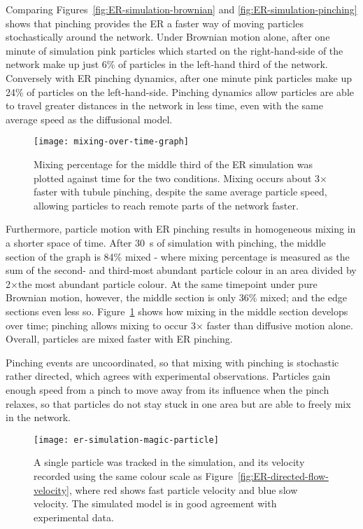 Comparing Figures~\ref{fig:ER-simulation-brownian} and \ref{fig:ER-simulation-pinching} shows that pinching provides the ER a faster way of moving particles stochastically around the network. 
Under Brownian motion alone, after one minute of simulation pink particles which started on the right-hand-side of the network make up just 6\% of particles in the left-hand third of the network. 
Conversely with ER pinching dynamics, after one minute pink particles make up 24\% of particles on the left-hand-side. 
Pinching dynamics allow particles are able to travel greater distances in the network in less time, even with the same average speed as the diffusional model. 

\begin{figure}[b!]
	\centering
	\texttt{[image: mixing-over-time-graph]}
	\caption[ER simulation: Tubule pinching provides faster mixing than Brownian motion alone]{Mixing percentage for the middle third of the ER simulation was plotted against time for the two conditions. Mixing occurs about 3$\times$ faster with tubule pinching, despite the same average particle speed, allowing particles to reach remote parts of the network faster.}
	\label{fig:mixing-over-time-graph}
\end{figure}

Furthermore, particle motion with ER pinching results in homogeneous mixing in a shorter space of time. 
After \SI{30}{\second} of simulation with pinching, the middle section of the graph is 84\% mixed - where mixing percentage is measured as the sum of the second- and third-most abundant particle colour in an area divided by 2$\times$the most abundant particle colour. 
At the same timepoint under pure Brownian motion, however, the middle section is only 36\% mixed; and the edge sections even less so. 
Figure~\ref{fig:mixing-over-time-graph} shows how mixing in the middle section develops over time; pinching allows mixing to occur 3$\times$ faster than diffusive motion alone. 
Overall, particles are mixed faster with ER pinching. 

Pinching events are uncoordinated, so that mixing with pinching is stochastic rather directed, which agrees with experimental observations. 
Particles gain enough speed from a pinch to move away from its influence when the pinch relaxes, so that particles do not stay stuck in one area but are able to freely mix in the network. 
 
\begin{figure}[t!]
	\centering
	\texttt{[image: er-simulation-magic-particle]}
	\caption[ER simulation: The simulated model shows similar particle velocity tracks to experimental data]{A single particle was tracked in the simulation, and its velocity recorded using the same colour scale as Figure~\ref{fig:ER-directed-flow-velocity}, where red shows fast particle velocity and blue slow velocity. The simulated model is in good agreement with experimental data. }
	\label{fig:ER-simulation-magic-particle}
\end{figure}

